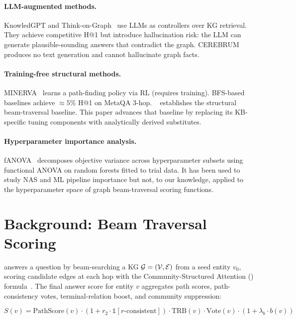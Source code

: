 \documentclass[10pt,twocolumn]{article}
\newcommand{\fanova}{f\textsc{ANOVA}}
\begin{document}
\paragraph{LLM-augmented methods.}
KnowledGPT and Think-on-Graph~\cite{sun2023tog} use LLMs as controllers over KG
retrieval. They achieve competitive H@1 but introduce hallucination risk: the LLM
can generate plausible-sounding answers that contradict the graph. CEREBRUM
produces no text generation and cannot hallucinate graph facts.

\paragraph{Training-free structural methods.}
MINERVA~\cite{das2018minerva} learns a path-finding policy via RL (requires
training). BFS-based baselines achieve $\approx5\%$ H@1 on MetaQA 3-hop.
\CEREBRUM{}~\cite{buchorn2026report} establishes the structural beam-traversal
baseline. This paper advances that baseline by replacing its KB-specific
tuning components with analytically derived substitutes.

\paragraph{Hyperparameter importance analysis.}
\fanova{}~\cite{hutter2014fanova} decomposes objective variance across hyperparameter
subsets using functional ANOVA on random forests fitted to trial data. It has been
used to study NAS and ML pipeline importance but not, to our knowledge, applied to
the hyperparameter space of graph beam-traversal scoring functions.

\section{Background: Beam Traversal Scoring}
\label{sec:background}

\CEREBRUM{} answers a question by beam-searching a KG $\mathcal{G} = (\mathcal{V}, \mathcal{E})$
from a seed entity $v_0$, scoring candidate edges at each hop with the
Community-Structured Attention (\CSA{}) formula~\cite{buchorn2026report}.
The final answer score for entity $v$ aggregates path scores, path-consistency
votes, terminal-relation boost, and community suppression:

\begin{equation}
  S(v) = \mathrm{PathScore}(v)
         \cdot (1 + r_2 \cdot \mathbb{1}[r\text{-consistent}])
         \cdot \mathrm{TRB}(v)
         \cdot \mathrm{Vote}(v)
         \cdot (1 + \lambda_b \cdot b(v))
  \label{eq:score}
\end{equation}
\end{document}
